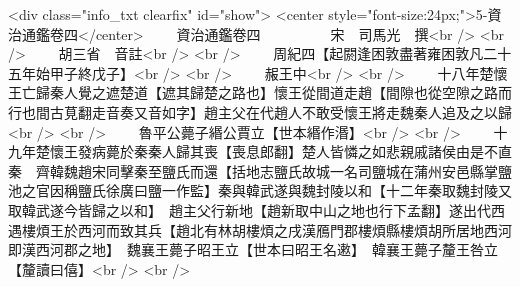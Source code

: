 <div class="info_txt clearfix" id="show">
<center style="font-size:24px;">5-資治通鑑卷四</center>
  　　資治通鑑卷四　　　　　宋　司馬光　撰<br />
<br />
　　胡三省　音註<br />
<br />
　　周紀四【起閼逢困敦盡著雍困敦凡二十五年始甲子終戊子】<br />
<br />
　　赧王中<br />
<br />
　　十八年楚懷王亡歸秦人覺之遮楚道【遮其歸楚之路也】懷王從間道走趙【間隙也從空隙之路而行也間古莧翻走音奏又音如字】趙主父在代趙人不敢受懷王將走魏秦人追及之以歸<br />
<br />
　　魯平公薨子緡公賈立【世本緡作湣】<br />
<br />
　　十九年楚懷王發病薨於秦秦人歸其喪【喪息郎翻】楚人皆憐之如悲親戚諸侯由是不直秦　齊韓魏趙宋同擊秦至鹽氏而還【括地志鹽氏故城一名司鹽城在蒲州安邑縣掌鹽池之官因稱鹽氏徐廣曰鹽一作監】秦與韓武遂與魏封陵以和【十二年秦取魏封陵又取韓武遂今皆歸之以和】　趙主父行新地【趙新取中山之地也行下孟翻】遂出代西遇樓煩王於西河而致其兵【趙北有林胡樓煩之戌漢鴈門郡樓煩縣樓煩胡所居地西河即漢西河郡之地】　魏襄王薨子昭王立【世本曰昭王名遫】　韓襄王薨子釐王咎立【釐讀曰僖】<br />
<br />
